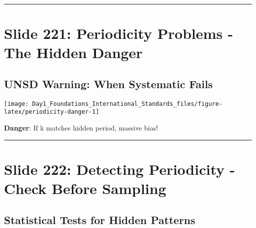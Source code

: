 \documentclass[
]{article}
\begin{document}
\begin{center}\rule{0.5\linewidth}{0.5pt}\end{center}

\section{Slide 221: Periodicity Problems - The Hidden
Danger}\label{slide-221-periodicity-problems---the-hidden-danger}

\subsection{UNSD Warning: When Systematic
Fails}\label{unsd-warning-when-systematic-fails}

\texttt{[image: Day1\_Foundations\_International\_Standards\_files/figure-latex/periodicity-danger-1]}

\textbf{Danger}: If k matches hidden period, massive bias!

\begin{center}\rule{0.5\linewidth}{0.5pt}\end{center}

\section{Slide 222: Detecting Periodicity - Check Before
Sampling}\label{slide-222-detecting-periodicity---check-before-sampling}

\subsection{Statistical Tests for Hidden
Patterns}\label{statistical-tests-for-hidden-patterns}
\end{document}
